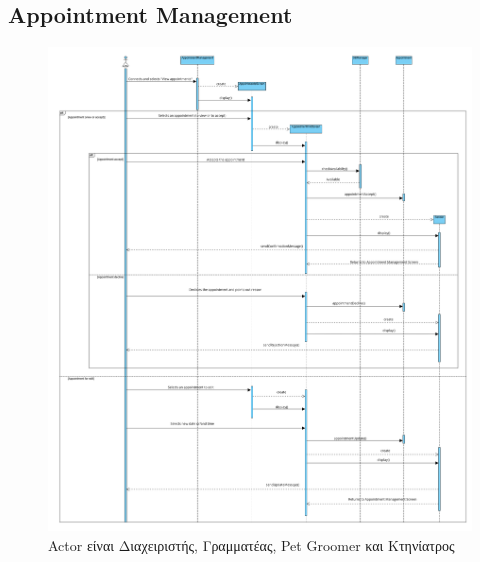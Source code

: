 \documentclass[12pt,a4paper,twoside]{book}
\begin{document}
\subsection{Appointment Management}
\begin{figure}[H]
    \centering
    \includegraphics[width=\textwidth]{Resources/Sequence Diagram/appointment-management_sequence.png}
    \caption{Actor είναι Διαχειριστής, Γραμματέας, Pet Groomer και Κτηνίατρος}\label{fig:sequence-appointment-management}
\end{figure}
\end{document}
